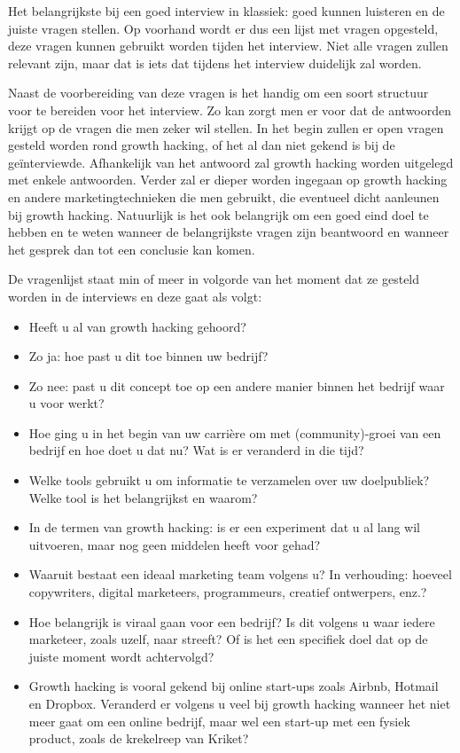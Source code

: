 Het belangrijkste bij een goed interview in klassiek: goed kunnen luisteren en de juiste vragen stellen. Op voorhand wordt er dus een lijst met vragen opgesteld, deze vragen kunnen gebruikt worden tijden het interview. Niet alle vragen zullen relevant zijn, maar dat is iets dat tijdens het interview duidelijk zal worden.

Naast de voorbereiding van deze vragen is het handig om een soort structuur voor te bereiden voor het interview. Zo kan zorgt men er voor dat de antwoorden krijgt op de vragen die men zeker wil stellen. In het begin zullen er open vragen gesteld worden rond growth hacking, of het al dan niet gekend is bij de geïnterviewde. Afhankelijk van het antwoord zal growth hacking worden uitgelegd met enkele antwoorden. Verder zal er dieper worden ingegaan op growth hacking en andere marketingtechnieken die men gebruikt, die eventueel dicht aanleunen bij growth hacking. Natuurlijk is het ook belangrijk om een goed eind doel te hebben en te weten wanneer de belangrijkste vragen zijn beantwoord en wanneer het gesprek dan tot een conclusie kan komen.

De vragenlijst staat min of meer in volgorde van het moment dat ze gesteld worden in de interviews en deze gaat als volgt:
\begin{itemize} 
	\item Heeft u al van growth hacking gehoord?
	\item Zo ja: hoe past u dit toe binnen uw bedrijf?
	\item Zo nee: past u dit concept toe op een andere manier binnen het bedrijf waar u voor werkt?
	\item Hoe ging u in het begin van uw carrière om met (community)-groei van een bedrijf en hoe doet u dat nu? Wat is er veranderd in die tijd?
	\item Welke tools gebruikt u om informatie te verzamelen over uw doelpubliek? Welke tool is het belangrijkst en waarom?
	\item In de termen van growth hacking: is er een experiment dat u al lang wil uitvoeren, maar nog geen middelen heeft voor gehad?
	\item Waaruit bestaat een ideaal marketing team volgens u? In verhouding: hoeveel copywriters, digital marketeers, programmeurs, creatief ontwerpers, enz.?
	\item Hoe belangrijk is viraal gaan voor een bedrijf? Is dit volgens u waar iedere marketeer, zoals uzelf, naar streeft? Of is het een specifiek doel dat op de juiste moment wordt achtervolgd?
	\item Growth hacking is vooral gekend bij online start-ups zoals Airbnb, Hotmail en Dropbox. Veranderd er volgens u veel bij growth hacking wanneer het niet meer gaat om een online bedrijf, maar wel een start-up met een fysiek product, zoals de krekelreep van Kriket?
\end{itemize}

